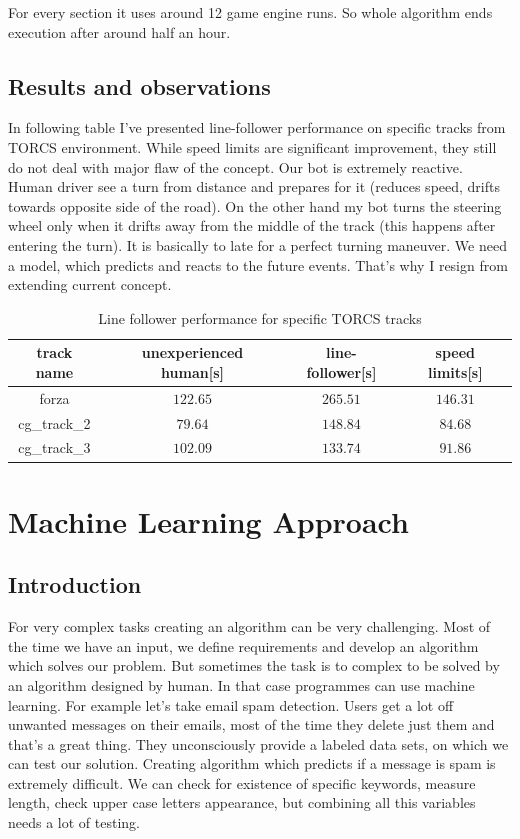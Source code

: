 \documentclass[declaration,shortabstract,english,inz]{iithesis}
\begin{document}
For every section it uses around 12 game engine runs. So whole algorithm ends execution after around half an hour.

\section{Results and observations}

In following table I've presented line-follower performance on specific tracks from TORCS environment. While speed limits are significant improvement, they still do not deal with major flaw of the concept. Our bot is extremely reactive. Human driver see a turn from distance and prepares for it (reduces speed, drifts towards opposite side of the road). On the other hand my bot turns the steering wheel only when it drifts away from the middle of the track (this happens after entering the turn). It is basically to late for a perfect turning maneuver. We need a model, which predicts and reacts to the  future events. That's why I resign from extending current concept.


\begin{table}[h]
    \centering
    \begin{tabular}{ |c|c|c|c|}
          \hline
          track name & unexperienced human[s] & line-follower[s] & speed limits[s]  \\
          \hline
          forza &  $122.65$ & $265.51$ & $146.31$   \\
          \hline
          cg\_track\_2 & $79.64$ & $148.84$ &  $84.68$  \\ 
          \hline
          cg\_track\_3 & $102.09$ & $133.74$ & $91.86$   \\
          \hline
        \end{tabular}
        \caption{Line follower performance for specific TORCS tracks}
        \label{tab:line_follower}

\end{table}

\chapter{Machine Learning Approach}

\section{Introduction}


For very complex tasks creating an algorithm can be very challenging.
 Most of the time we have an input, we define requirements and develop an algorithm which solves our problem. But sometimes the task is to complex to be solved by an algorithm designed by human. In that case programmes can use machine learning. For example let's take email spam detection. Users get a lot off unwanted messages on their emails, most of the time they delete just them and that's a great thing. They unconsciously provide a labeled data sets, on which we can test our solution. Creating algorithm which predicts if a message is spam is extremely difficult. We can check for existence of specific keywords, measure length, check upper case letters appearance, but combining all this variables needs a lot of testing.
\end{document}
